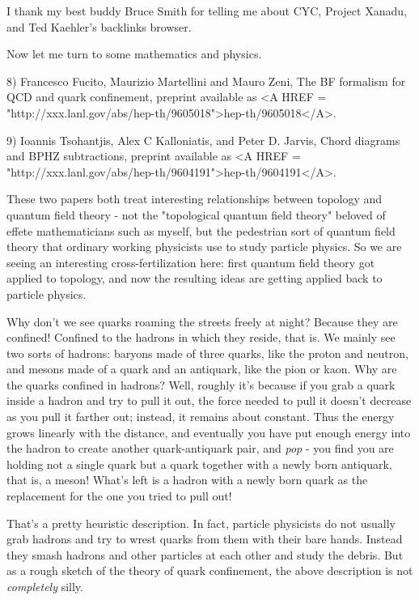 I thank my best buddy Bruce Smith for telling me about CYC, Project
Xanadu, and Ted Kaehler's backlinks browser.

Now let me turn to some mathematics and physics.

8) Francesco Fucito, Maurizio Martellini and Mauro Zeni, The BF
formalism for QCD and quark confinement, preprint available as
<A HREF = "http://xxx.lanl.gov/abs/hep-th/9605018">hep-th/9605018</A>.

9) Ioannis Tsohantjis, Alex C Kalloniatis, and Peter D. Jarvis, Chord
diagrams and BPHZ subtractions, preprint available as <A HREF = "http://xxx.lanl.gov/abs/hep-th/9604191">hep-th/9604191</A>.

These two papers both treat interesting relationships between topology
and quantum field theory - not the "topological quantum field theory"
beloved of effete mathematicians such as myself, but the pedestrian sort
of quantum field theory that ordinary working physicists use to study
particle physics.  So we are seeing an interesting cross-fertilization
here: first quantum field theory got applied to topology, and now the
resulting ideas are getting applied back to particle physics.

Why don't we see quarks roaming the streets freely at night?  Because
they are confined!  Confined to the hadrons in which they reside, that
is.  We mainly see two sorts of hadrons: baryons made of three quarks,
like the proton and neutron, and mesons made of a quark and an
antiquark, like the pion or kaon.  Why are the quarks confined in
hadrons?  Well, roughly it's because if you grab a quark inside a hadron
and try to pull it out, the force needed to pull it doesn't decrease as
you pull it farther out; instead, it remains about constant.  Thus the
energy grows linearly with the distance, and eventually you have put
enough energy into the hadron to create another quark-antiquark pair,
and \emph{pop} - you find you are holding not a single quark but a quark
together with a newly born antiquark, that is, a meson!  What's left is
a hadron with a newly born quark as the replacement for the one you
tried to pull out!

That's a pretty heuristic description.  In fact, particle physicists do
not usually grab hadrons and try to wrest quarks from them with their bare
hands.  Instead they smash hadrons and other particles at each other and
study the debris.  But as a rough sketch of the theory of quark
confinement, the above description is not \emph{completely} silly.


